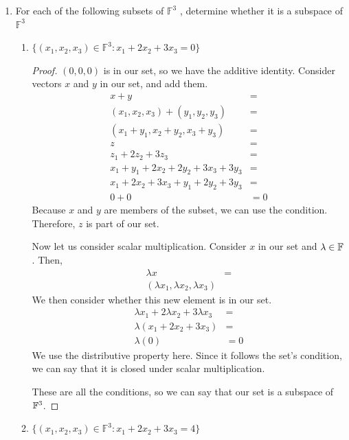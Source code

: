 \begin{enumerate}
    \item[1] For each of the following subsets of $\mathbb{F}^3$
, determine whether it is a subspace
of $\mathbb{F}^3$
    \begin{enumerate}
        \item $\{(x_1, x_2, x_3) \in \mathbb{F}^3: x_1 + 2x_2 + 3x_3 = 0\}$
        
        \begin{proof}
            $(0, 0, 0)$ is in our set, so we have the additive identity. Consider vectors $x$ and $y$ in our set, and add them. 
            \begin{align*}
                x + y &= \\
                (x_1, x_2, x_3) + (y_1, y_2, y_3) &= \\
                (x_1 + y_1, x_2 + y_2, x_3 + y_3) &= \\ 
                z &= \\
                z_1 + 2z_2 + 3z_3 &= \\
                x_1 + y_1 + 2x_2 + 2y_2 + 3x_3 + 3y_3 &= \\
                x_1 + 2x_2 + 3x_3 + y_1 + 2y_2 + 3y_3 &= \\
                0 + 0 &= 0
            \end{align*}
            Because $x$ and $y$ are members of the subset, we can use the condition. Therefore, $z$ is part of our set. 

            Now let us consider scalar multiplication. Consider $x$ in our set and $\lambda \in \mathbb{F}$. Then, 
            \begin{align*}
                \lambda x &= \\
                (\lambda x_1, \lambda x_2, \lambda x_3)
            \end{align*}
            We then consider whether this new element is in our set. 
            \begin{align*}
                \lambda x_1 + 2\lambda x_2 + 3\lambda x_3 &= \\
                \lambda(x_1 + 2x_2 + 3x_3) &= \\
                \lambda(0) &= 0
            \end{align*}
            We use the distributive property here. Since it follows the set's condition, we can say that it is closed under scalar multiplication.

            These are all the conditions, so we can say that our set is a subspace of $\mathbb{F}^3$.
        \end{proof}
        \item $\{(x_1, x_2, x_3) \in \mathbb{F}^3: x_1 + 2x_2 + 3x_3 = 4\}$


\end{enumerate}
\end{enumerate}
